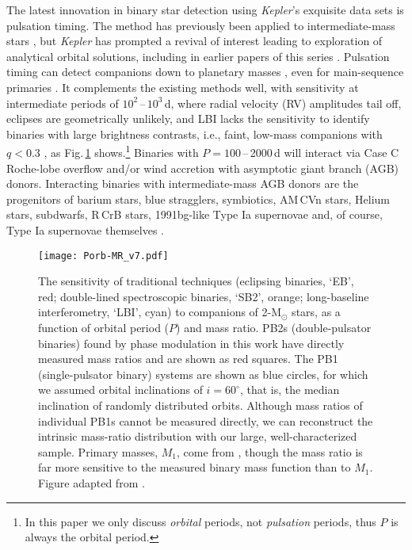 \documentclass[a4paper,fleqn,usenatbib]{mnras}
\begin{document}
The latest innovation in binary star detection using \textit{Kepler}'s exquisite data sets is pulsation timing. The method has previously been applied to intermediate-mass stars \citep[e.g.][]{barnes&moffett1975}, but \textit{Kepler} has prompted a revival of interest leading to exploration of analytical orbital solutions, including in earlier papers of this series \citep{shibahashi&kurtz2012,murphyetal2014,murphy&shibahashi2015,shibahashietal2015}. Pulsation timing can detect companions down to planetary masses \citep{silvottietal2007}, even for main-sequence primaries \citep{murphyetal2016c}. It complements the existing methods well, with sensitivity at intermediate periods of $10^2$\,--\,$10^3$\,d, where radial velocity (RV) amplitudes tail off, eclipses are geometrically unlikely, and LBI lacks the sensitivity to identify binaries with large brightness contrasts, i.e., faint, low-mass companions with $q < 0.3$ \citep{moe&distefano2017}, as Fig.\,\ref{fig:sensitivity} shows.\footnote{In this paper we only discuss {\it orbital} periods, not {\it pulsation} periods, thus $P$ is always the orbital period.}
 Binaries with $P = 100$\,--\,2000\,d will interact via Case C Roche-lobe overflow \citep{lauterborn1970,toonenetal2014} and/or wind accretion with asymptotic giant branch (AGB) donors. Interacting binaries with intermediate-mass AGB donors are the progenitors of barium stars, blue stragglers, symbiotics, AM\,CVn stars, Helium stars, subdwarfs, R\,CrB stars, 1991bg-like Type Ia supernovae and, of course, Type Ia supernovae themselves \citep{boffin&jorissen1988,karakasetal2000,hanetal2002,mikolajewska2007,ruiteretal2009,geller&mathieu2011,zhang&jeffrey2012,claeysetal2014,maozetal2014}.


\begin{figure}
\begin{center}
\texttt{[image: Porb-MR\_v7.pdf]}
\caption{The sensitivity of traditional techniques (eclipsing binaries, `EB', red; double-lined spectroscopic binaries, `SB2', orange; long-baseline interferometry, `LBI', cyan) to companions of 2-M$_{\odot}$ stars, as a function of orbital period ($P$) and mass ratio. PB2s (double-pulsator binaries) found by phase modulation in this work have directly measured mass ratios and are shown as red squares. The PB1 (single-pulsator binary) systems are shown as blue circles, for which we assumed orbital inclinations of $i=60^{\circ}$, that is, the median inclination of randomly distributed orbits. Although mass ratios of individual PB1s cannot be measured directly, we can reconstruct the intrinsic mass-ratio distribution with our large, well-characterized sample. Primary masses, $M_1$, come from \citet{huberetal2014}, though the mass ratio is far more sensitive to the measured binary mass function than to $M_1$. Figure adapted from \citet{moe&distefano2017}.}
\label{fig:sensitivity}
\vspace{-3mm}
\end{center}
\end{figure}
\end{document}

